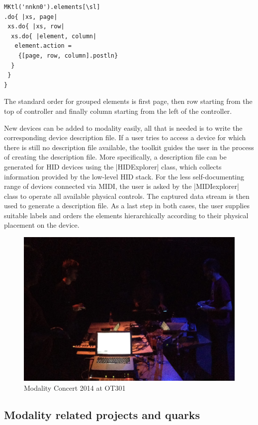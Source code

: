 \documentclass{article}
\begin{document}
\begin{Verbatim}
MKtl('nnkn0').elements[\sl]
.do{ |xs, page|
 xs.do{ |xs, row|
  xs.do{ |element, column|
   element.action = 
    {[page, row, column].postln}
  }
 }
}
\end{Verbatim}

The standard order for grouped elements is first page, then row starting from the top of controller and finally column starting from the left of the controller.

New devices can be added to modality easily, all that is needed is to write the corresponding device description file. 
If a user tries to access a device for which there is still no description file available, the toolkit guides the user in the process of creating the description file. 
More specifically, a description file can be generated for HID devices using the |HIDExplorer| class, which collects information provided by the low-level HID stack. 
For the less self-documenting range of devices connected via MIDI, the user is asked by the |MIDIexplorer| class to operate all available physical controls. 
The captured data stream is then used to generate a description file.
As a last step in both cases, the user supplies suitable labels and orders the elements hierarchically according to their physical placement on the device.




\begin{figure}[h]
	\centering
		\includegraphics[width=.9\columnwidth]{../media/20140405-IMG_1691.jpg}
	\caption{Modality Concert 2014 at OT301}
	\label{fig:media_20140405-IMG_1691}
\end{figure}

\subsection{Modality related projects and quarks} 
\end{document}
